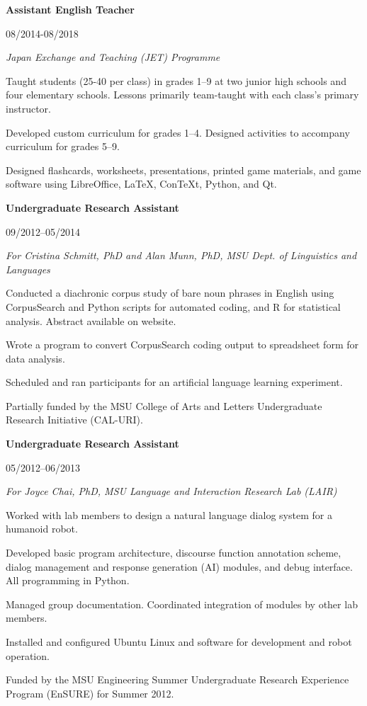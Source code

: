 \documentclass[10pt,oneside]{article}
\newcommand{\resbigitem}[4]{
	\item \parbox[t]{0.8\textwidth}{\textbf{#1}} \hfill #2 \\
		\parbox[t]{0.8\textwidth}{\textit{#3}} \hfill \textit{#4}
}
\begin{document}
\begin{reslist}
	\resbigitem{Assistant English Teacher}
		{08/2014-08/2018}
		{Japan Exchange and Teaching (JET) Programme}
		{}
	\begin{reslist}
		\item Taught students (25-40 per class) in grades 1--9 at two junior high schools and four elementary schools. Lessons primarily team-taught with each class's primary instructor.
		\item Developed custom curriculum for grades 1--4. Designed activities to accompany curriculum for grades 5--9.
		\item Designed flashcards, worksheets, presentations, printed game materials, and game software using LibreOffice, LaTeX, ConTeXt, Python, and Qt.
	\end{reslist}

	\resbigitem{Undergraduate Research Assistant}
		{09/2012--05/2014}
		{For Cristina Schmitt, PhD and Alan Munn, PhD, MSU Dept. of Linguistics and Languages}
		{}
	\begin{reslist}
		\item Conducted a diachronic corpus study of bare noun phrases in English using CorpusSearch and Python scripts for automated coding, and R for statistical analysis. Abstract available on website.
		\item Wrote a program to convert CorpusSearch coding output to spreadsheet form for data analysis.
		\item Scheduled and ran participants for an artificial language learning experiment.
		\item Partially funded by the MSU College of Arts and Letters Undergraduate Research Initiative (CAL-URI).
	\end{reslist}
	
	\resbigitem{Undergraduate Research Assistant}
		{05/2012--06/2013}
		{For Joyce Chai, PhD, MSU Language and Interaction Research Lab (LAIR)}
		{}
	\begin{reslist}
		\item Worked with lab members to design a natural language dialog system for a humanoid robot.
		\item Developed basic program architecture, discourse function annotation scheme, dialog management and response generation (AI) modules, and debug interface. All programming in Python.
		\item Managed group documentation. Coordinated integration of modules by other lab members.
		\item Installed and configured Ubuntu Linux and software for development and robot operation.
		\item Funded by the MSU Engineering Summer Undergraduate Research Experience Program (EnSURE) for Summer 2012.
	\end{reslist}
	

\end{reslist}
\end{document}
